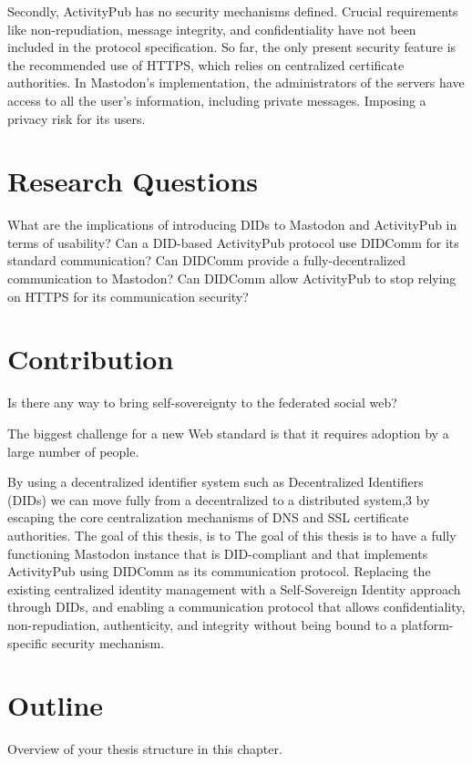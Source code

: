Secondly, ActivityPub has no security mechanisms defined. Crucial requirements like non-repudiation, message integrity, and confidentiality have not been included in the protocol specification. So far, the only present security feature is the recommended use of HTTPS, which relies on centralized certificate authorities. In Mastodon's implementation, the administrators of the servers have access to all the user's information, including private messages. Imposing a privacy risk for its users. 

\section{Research Questions}

What are the implications of introducing DIDs to Mastodon and ActivityPub in terms of usability?
Can a DID-based ActivityPub protocol use DIDComm for its standard communication?
Can DIDComm provide a fully-decentralized communication to Mastodon?
Can DIDComm allow ActivityPub to stop relying on HTTPS for its communication security?

\section{Contribution}
Is there any way to bring self-sovereignty to the federated social web? \cite{webber_sporny_2017}

The biggest challenge for a new Web standard is that it requires adoption by a large number of people.

By using a decentralized identifier system such as Decentralized Identifiers (DIDs) we can move fully from a decentralized to a distributed system,3 by escaping the core centralization mechanisms of DNS and SSL certificate authorities.
The goal of this thesis, is to 
The goal of this thesis is to have a fully functioning Mastodon instance that is DID-compliant and that implements ActivityPub using DIDComm as its communication protocol. 
Replacing the existing centralized identity management with a Self-Sovereign Identity approach through DIDs, and enabling a communication protocol that allows confidentiality, non-repudiation, authenticity, and integrity without being bound to a platform-specific security mechanism.
 
\section{Outline}
Overview of your thesis structure in this chapter.

